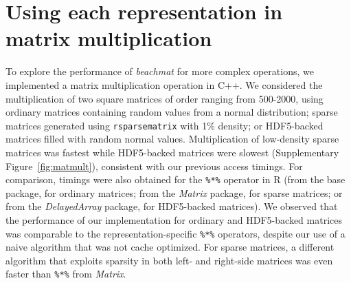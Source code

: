 \documentclass{article}
\newcommand{\beachmat}{\textit{beachmat}}
\newcommand{\code}[1]{\texttt{#1}}
\begin{document}
\section{Using each representation in matrix multiplication}
To explore the performance of \beachmat{} for more complex operations, we implemented a matrix multiplication operation in C++.
We considered the multiplication of two square matrices of order ranging from 500-2000, using ordinary matrices containing random values from a normal distribution;
sparse matrices generated using \code{rsparsematrix} with 1\% density;
or HDF5-backed matrices filled with random normal values.
Multiplication of low-density sparse matrices was fastest while HDF5-backed matrices were slowest (Supplementary Figure~\ref{fig:matmult}), consistent with our previous access timings.
For comparison, timings were also obtained for the \code{\%*\%} operator in R (from the base package, for ordinary matrices; 
from the \textit{Matrix} package, for sparse matrices;
or from the \textit{DelayedArray} package, for HDF5-backed matrices).
We observed that the performance of our implementation for ordinary and HDF5-backed matrices was comparable to the representation-specific \code{\%*\%} operators,
despite our use of a naive algorithm that was not cache optimized.
For sparse matrices, a different algorithm that exploits sparsity in both left- and right-side matrices was even faster than \code{\%*\%} from \textit{Matrix}.



\end{document}
